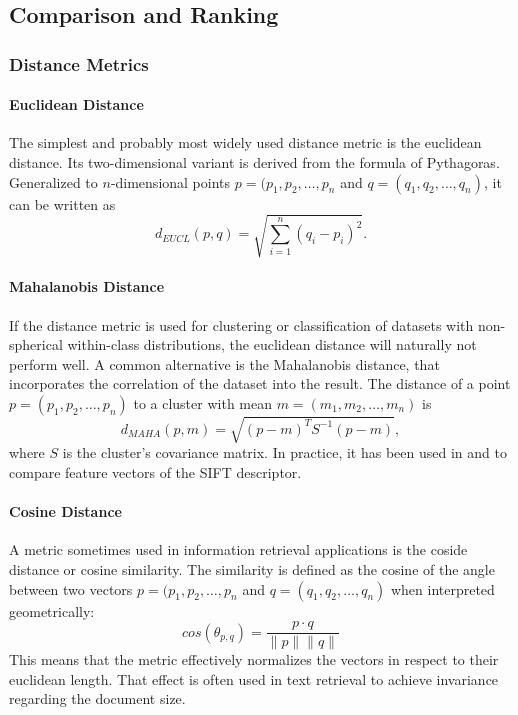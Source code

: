 \subsection{Comparison and Ranking}\label{sec:anatomy_ranking}

\subsubsection{Distance Metrics}

\paragraph{Euclidean Distance}

The simplest and probably most widely used distance metric is the euclidean
distance. Its two-dimensional variant is derived from the formula of
Pythagoras. Generalized to $n$-dimensional points $p = (p_1, p_2, \dots, p_n$
and $q = (q_1, q_2, \dots, q_n)$, it can be written as
\begin{equation*}
    d_{EUCL}(p, q) = \sqrt{\sum_{i=1}^n (q_i - p_i)^2}.
\end{equation*}

\paragraph{Mahalanobis Distance}

If the distance metric is used for clustering or classification of datasets
with non-spherical within-class distributions, the euclidean distance will
naturally not perform well. A common alternative is the Mahalanobis distance,
that incorporates the correlation of the dataset into the result. The distance
of a point $p = (p_1, p_2, \dots, p_n)$ to a cluster with mean $m = (m_1, m_2,
\dots, m_n)$ is
\begin{equation*}
    d_{MAHA}(p, m) = \sqrt{(p - m)^T S^{-1} (p - m)},
\end{equation*}
where $S$ is the cluster's covariance matrix. In practice, it has been used in
\autocite{mikolajczyk_scale_2004} and \autocite{sivic_video_2003} to compare
feature vectors of the SIFT \autocite{lowe_object_1999} descriptor.

\paragraph{Cosine Distance}

A metric sometimes used in information retrieval applications is the coside
distance or cosine similarity. The similarity is defined as the cosine of the
angle between two vectors $p = (p_1, p_2, \dots, p_n$ and $q = (q_1, q_2,
\dots, q_n)$ when interpreted geometrically:
\begin{equation*}
    cos(\theta_{p, q}) = \frac{p \cdot q}{\|p\| \|q\|}
\end{equation*}
This means that the metric effectively normalizes the vectors in respect to
their euclidean length. That effect is often used in text retrieval to achieve
invariance regarding the document size.

